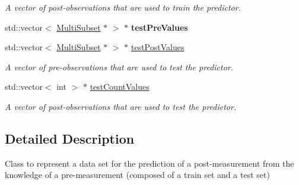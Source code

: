\begin{DoxyCompactItemize}
\begin{DoxyCompactList}\small\item\em A vector of post-\/observations that are used to train the predictor. \end{DoxyCompactList}\item 
\hypertarget{classPredictionDataset_a6ef1712f6f3e944cad7f966b123c44d4}{std\-::vector$<$ \hyperlink{classMultiSubset}{Multi\-Subset} $\ast$ $>$ $\ast$ {\bfseries test\-Pre\-Values}}\label{classPredictionDataset_a6ef1712f6f3e944cad7f966b123c44d4}

\item 
\hypertarget{classPredictionDataset_ab6ed50cd17878109b9a41ebb6db172ea}{std\-::vector$<$ \hyperlink{classMultiSubset}{Multi\-Subset} $\ast$ $>$ $\ast$ \hyperlink{classPredictionDataset_ab6ed50cd17878109b9a41ebb6db172ea}{test\-Post\-Values}}\label{classPredictionDataset_ab6ed50cd17878109b9a41ebb6db172ea}

\begin{DoxyCompactList}\small\item\em A vector of pre-\/observations that are used to test the predictor. \end{DoxyCompactList}\item 
\hypertarget{classPredictionDataset_a7fe2eccbdae1cee136f5864b660c31ee}{std\-::vector$<$ int $>$ $\ast$ \hyperlink{classPredictionDataset_a7fe2eccbdae1cee136f5864b660c31ee}{test\-Count\-Values}}\label{classPredictionDataset_a7fe2eccbdae1cee136f5864b660c31ee}

\begin{DoxyCompactList}\small\item\em A vector of post-\/observations that are used to test the predictor. \end{DoxyCompactList}\end{DoxyCompactItemize}


\subsection{Detailed Description}
Class to represent a data set for the prediction of a post-\/measurement from the knowledge of a pre-\/measurement (composed of a train set and a test set) 

